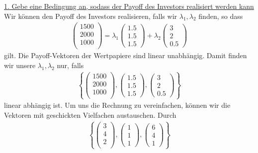 \underline{1. Gebe eine Bedingung an, sodass der Payoff des Investors realisiert werden kann}\\
Wir können den Payoff des Investors realisieren, falls wir $\lambda_1, \lambda_2$ finden, so dass
\begin{align*}
\begin{pmatrix}
1500\\
2000\\
1000\\
\end{pmatrix}
= \lambda_1 
\begin{pmatrix}
1.5\\
1.5\\
1.5
\end{pmatrix}
+ \lambda_2
\begin{pmatrix}
3\\
2\\ 
0.5
\end{pmatrix}
\end{align*}
gilt.
Die Payoff-Vektoren der Wertpapiere sind linear unabhängig.
Damit finden wir unsere $\lambda_1, \lambda_2$ nur, falls
\begin{align*}
\left\lbrace 
\begin{pmatrix}
1500\\
2000\\
1000\\
\end{pmatrix},
\begin{pmatrix}
1.5\\
1.5\\
1.5
\end{pmatrix},
\begin{pmatrix}
3\\
2\\ 
0.5
\end{pmatrix}
\right\rbrace
\end{align*}
linear abhängig ist.
Um uns die Rechnung zu vereinfachen, können wir die Vektoren mit geschickten Vielfachen austauschen.
Durch
\begin{align*}
\left\lbrace 
\begin{pmatrix}
3\\
4\\
2\\
\end{pmatrix},
\begin{pmatrix}
1\\
1\\
1
\end{pmatrix},
\begin{pmatrix}
6\\
4\\ 
1
\end{pmatrix}
\right\rbrace
\end{align*}
